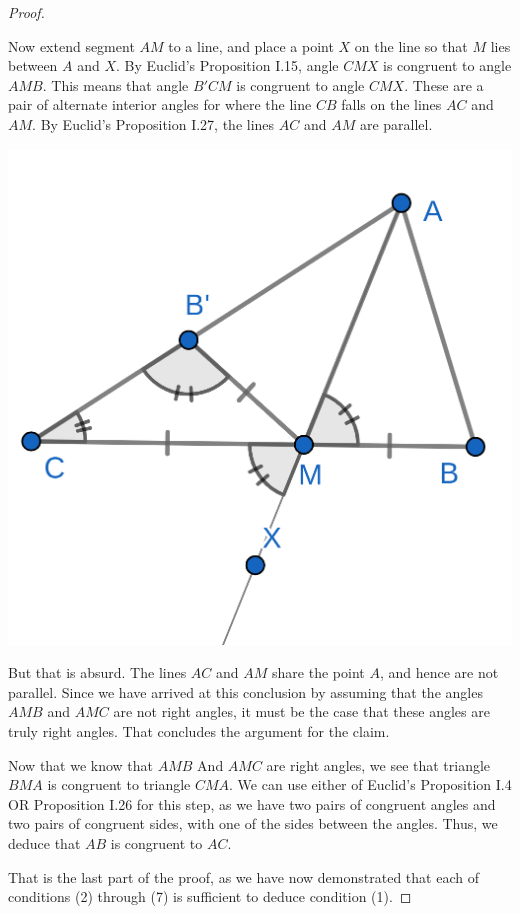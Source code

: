 \documentclass{tufte-handout}
\theoremstyle{definition}
\begin{document}
\begin{proof}
\begin{description}
Now extend segment $AM$ to a line, and place a point $X$ on the line so that $M$ lies between $A$ and $X$. By Euclid's Proposition I.15, angle $CMX$ is congruent to angle $AMB$. This means that angle $B'CM$ is congruent to angle $CMX$. These are a pair of alternate interior angles for where the line $CB$ falls on the lines $AC$ and $AM$. By Euclid's Proposition I.27, the lines $AC$ and $AM$ are parallel.

\begin{marginfigure}
  \includegraphics{images/iso_5.png}
\end{marginfigure}

But that is absurd. The lines $AC$ and $AM$ share the point $A$, and hence are not parallel. Since we have arrived at this conclusion by assuming that the angles $AMB$ and $AMC$ are not right angles, it must be the case that these angles are truly right angles. That concludes the argument for the claim.

Now that we know that $AMB$ And $AMC$ are right angles, we see that triangle $BMA$ is congruent to triangle $CMA$. We can use either of Euclid's Proposition I.4 OR Proposition I.26 for this step, as we have two pairs of congruent angles and two pairs of congruent sides, with one of the sides between the angles. Thus, we deduce that $AB$ is congruent to $AC$.
\end{description}
That is the last part of the proof, as we have now demonstrated that each of conditions (2) through (7) is sufficient to deduce condition (1).
\end{proof}
\end{document}
